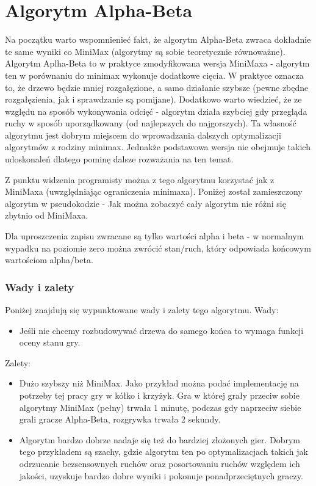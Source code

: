 \documentclass[polish,shortabstract,inz]{iithesis}
\begin{document}
\section{Algorytm Alpha-Beta}
Na początku warto wspomnienieć fakt, że algorytm Alpha-Beta zwraca dokładnie te same wyniki co MiniMax (algorytmy są sobie teoretycznie równoważne).
Algorytm Aplha-Beta to w praktyce zmodyfikowana wersja MiniMaxa - algorytm ten w porównaniu do minimax wykonuje dodatkowe cięcia.
W praktyce oznacza to, że drzewo będzie mniej rozgałęzione, a samo działanie szybsze (pewne zbędne rozgałęzienia, jak i sprawdzanie są pomijane).
Dodatkowo warto wiedzieć, że ze względu na sposób wykonywania odcięć - algorytm działa szybciej gdy przegląda ruchy w sposób uporządkowany (od najlepszych do najgorszych).
Ta własność algorytmu jest dobrym miejscem do wprowadzania dalszych optymalizacji algorytmów z rodziny minimax.
Jednakże podstawowa wersja nie obejmuje takich udoskonaleń dlatego pominę dalsze rozważania na ten temat.

Z punktu widzenia programisty można z tego algorytmu korzystać jak z MiniMaxa (uwzględniając ograniczenia minimaxa).
Poniżej został zamieszczony algorytm w pseudokodzie - Jak można zobaczyć cały algorytm nie różni się zbytnio od MiniMaxa.


Dla uproszczenia zapisu zwracane są tylko wartości alpha i beta - w normalnym wypadku na poziomie zero można zwrócić stan/ruch, który odpowiada końcowym wartościom alpha/beta.

\subsubsection{Wady i zalety}
Poniżej znajdują się wypunktowane wady i zalety tego algorytmu.
\newline Wady:
\begin{itemize}
  \item Jeśli nie chcemy rozbudowywać drzewa do samego końca to wymaga funkcji oceny stanu gry.
\end{itemize}
Zalety:
\begin{itemize}
  \item Dużo szybszy niż MiniMax. Jako przykład można podać implementację na potrzeby tej pracy gry w kółko i krzyżyk. Gra w której grały przeciw sobie algorytmy MiniMax (pełny) trwała 1 minutę, podczas gdy naprzeciw siebie grali gracze Alpha-Beta, rozgrywka trwała 2 sekundy.
  \item Algorytm bardzo dobrze nadaje się też do bardziej złożonych gier. Dobrym tego przykładem są szachy, gdzie algorytm ten po optymalizacjach takich jak odrzucanie bezsensownych ruchów oraz posortowaniu ruchów względem ich jakości, uzyskuje bardzo dobre wyniki i pokonuje ponadprzeciętnych graczy.
\end{itemize}
\end{document}
